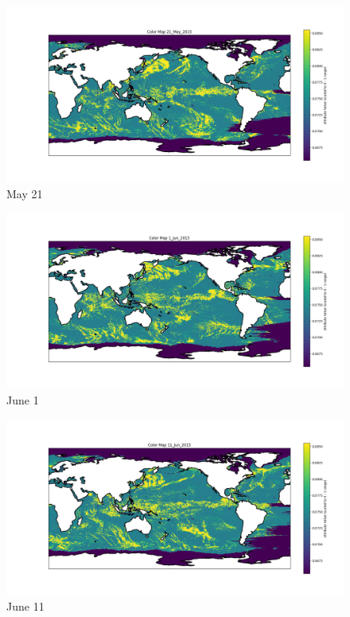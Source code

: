 \documentclass[conference]{IEEEtran}
\begin{document}
\begin{enumerate}
    
    
    \begin{figure}
        \centering
        \includegraphics[width=1\linewidth]{Figure_3.png}
        \caption{May 21}
        \label{fig:enter-label}
    \end{figure}
    
    
    \begin{figure}
        \centering
        \includegraphics[width=1\linewidth]{Figure_4.png}
        \caption{June 1}
        \label{fig:enter-label}
    \end{figure}

    \begin{figure}
        \centering
        \includegraphics[width=1\linewidth]{Figure_5.png}
        \caption{June 11}
        \label{fig:enter-label}
    \end{figure}


\end{enumerate}
\end{document}
